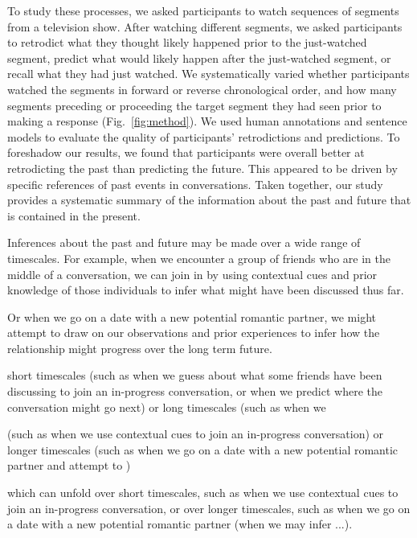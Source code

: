 To study these processes, we asked participants to watch sequences of segments from a television show.  After watching different segments, we asked participants to retrodict what they thought likely happened prior to the just-watched segment, predict what would likely happen after the just-watched segment, or recall what they had just watched.  We systematically varied whether participants watched the segments in forward or reverse chronological order, and how many segments preceding or proceeding the target segment they had seen prior to making a response (Fig.~\ref{fig:method}).  We used human annotations and sentence models to evaluate the quality of participants' retrodictions and predictions.  To foreshadow our results, we found that participants were overall better at retrodicting the past than predicting the future.  This appeared to be driven by specific references of past events in conversations.  Taken together, our study provides a systematic summary of the information about the past and future that is contained in the present.





 Inferences about the past and future may be made over a wide range of timescales.  For example, when we encounter a group of friends who are in the middle of a conversation, we can join in by using contextual cues and prior knowledge of those individuals to infer what might have been discussed thus far.

Or when we go on a date with a new potential romantic partner, we might attempt to draw on our observations and prior experiences to infer how the relationship might progress over the long term future.



short timescales (such as when we guess about what some friends have been discussing to join an in-progress conversation, or when we predict where the conversation might go next) or long timescales (such as when we 

(such as when we use contextual cues to join an in-progress conversation) or longer timescales (such as when we go on a date with a new potential romantic partner and attempt to )

which can unfold over short timescales, such as when we use contextual cues to join an in-progress conversation, or over longer timescales, such as when we go on a date with a new potential romantic partner (when we may infer ...).  


